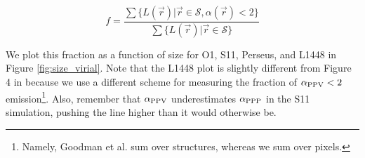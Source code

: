 \begin{equation}
f = \frac{\sum{\{L(\vec{r}) | \vec{r} \in \mathcal{S} , \alpha(\vec{r}) < 2}\}}{\sum{\{L(\vec{r}) | \vec{r} \in \mathcal{S}}\}}
\label{eq:frac}
\end{equation}

We plot this fraction as a function of size for O1, S11, Perseus, and L1448 in Figure \ref{fig:size_virial}. Note that the L1448 plot is slightly different from Figure 4 in \cite{http://adsabs.harvard.edu/abs/2009Natur.457...63G} because we use a different scheme
for measuring the fraction of $\alpha_{\rm PPV} < 2$ emission\footnote{Namely, Goodman et al. sum over structures, whereas we sum over pixels.}. Also, remember that $\alpha_{\rm PPV}$ underestimates $\alpha_{\rm PPP}$ in the S11 simulation, pushing the line higher than it would otherwise be.

